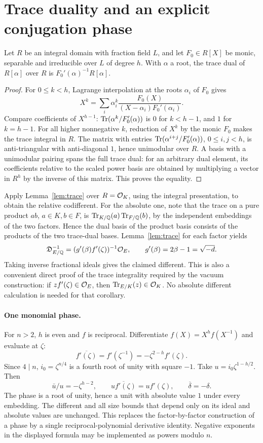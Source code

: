 \documentclass[11pt]{article}
\begin{document}
\section{Trace duality and an explicit conjugation phase}
\begin{lemma}\label{lem:trace}
Let $R$ be an integral domain with fraction field $L$, and let $F_0\in R[X]$ be monic, separable and irreducible over $L$ of degree $h$. With $\alpha$ a root, the trace dual of $R[\alpha]$ over $R$ is $F_0'(\alpha)^{-1}R[\alpha]$.
\end{lemma}
\begin{proof}
For $0\le k<h$, Lagrange interpolation at the roots $\alpha_i$ of $F_0$ gives
\[
 X^k=\sum_i \alpha_i^k \frac{F_0(X)}{(X-\alpha_i)F_0'(\alpha_i)}.
\]
Compare coefficients of $X^{h-1}$: $\operatorname{Tr}(\alpha^k/F_0'(\alpha))$ is $0$ for $k<h-1$, and $1$ for $k=h-1$. For all higher nonnegative $k$, reduction of $X^k$ by the monic $F_0$ makes the trace integral in $R$. The matrix with entries $\operatorname{Tr}(\alpha^{i+j}/F_0'(\alpha))$, $0\le i,j<h$, is anti-triangular with anti-diagonal $1$, hence unimodular over $R$. A basis with a unimodular pairing spans the full trace dual: for an arbitrary dual element, its coefficients relative to the scaled power basis are obtained by multiplying a vector in $R^h$ by the inverse of this matrix. This proves the equality.
\end{proof}
Apply Lemma~\ref{lem:trace} over $R=\mathcal O_K$, using the integral presentation, to obtain the relative codifferent. For the absolute one, note that the trace on a pure product $ab$, $a\in K,b\in F$, is $\operatorname{Tr}_{K/\mathbb Q}(a)\operatorname{Tr}_{F/\mathbb Q}(b)$, by the independent embeddings of the two factors. Hence the dual basis of the product basis consists of the products of the two trace-dual bases. Lemma~\ref{lem:trace} for each factor yields
\[
\mathfrak D^{-1}_{E/\mathbb Q}=(g'(\beta) f'(\zeta))^{-1}\mathcal O_E,
\qquad g'(\beta)=2\beta-1=\sqrt{-d}.
\]
Taking inverse fractional ideals gives the claimed different. This is also a convenient direct proof of the trace integrality required by the vacuum construction: if $z f'(\zeta)\in\mathcal O_E$, then $\operatorname{Tr}_{E/K}(z)\in\mathcal O_K$. No absolute different calculation is needed for that corollary.

\paragraph{One monomial phase.} For $n>2$, $h$ is even and $f$ is reciprocal. Differentiate $f(X)=X^h f(X^{-1})$ and evaluate at $\zeta$:
\[
 \overline{f'(\zeta)}=f'(\zeta^{-1})=-\zeta^{2-h}f'(\zeta).
\]
Since $4\mid n$, $i_0=\zeta^{n/4}$ is a fourth root of unity with square $-1$. Take $u=i_0\zeta^{1-h/2}$. Then
\[
 \bar u/u=-\zeta^{h-2},\qquad \overline{u f'(\zeta)}=u f'(\zeta),
 \qquad \overline{\delta}=-\delta.
\]
The phase is a root of unity, hence a unit with absolute value $1$ under every embedding. The different and all size bounds that depend only on its ideal and absolute values are unchanged. This replaces the factor-by-factor construction of a phase by a single reciprocal-polynomial derivative identity. Negative exponents in the displayed formula may be implemented as powers modulo $n$.
\end{document}
